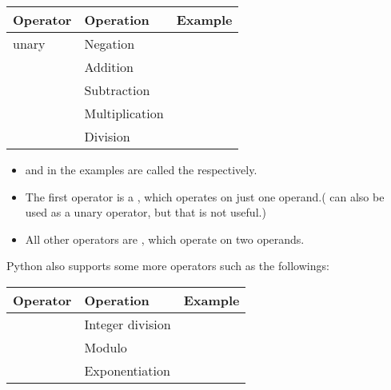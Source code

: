 \documentclass[letterpaper,10pt,english]{sphinxmanual}
\begin{document}
\begin{savenotes}\sphinxattablestart
\centering
\begin{tabulary}{\linewidth}[t]{|T|T|T|}
\hline
\sphinxstyletheadfamily 
Operator
&\sphinxstyletheadfamily 
Operation
&\sphinxstyletheadfamily 
Example
\\
\hline
unary \sphinxcode{\sphinxupquote{\sphinxhyphen{}}}
&
Negation
&
\\
\hline
\sphinxcode{\sphinxupquote{+}}
&
Addition
&
\\
\hline
\sphinxcode{\sphinxupquote{\sphinxhyphen{}}}
&
Subtraction
&
\\
\hline
\sphinxcode{\sphinxupquote{*}}
&
Multiplication
&
\\
\hline
\sphinxcode{\sphinxupquote{/}}
&
Division
&
\\
\hline
\end{tabulary}
\par
\sphinxattableend\end{savenotes}
\begin{itemize}
\item {} 
 and  in the examples are called the  respectively.

\item {} 
The first operator is a , which operates on just one operand.(\sphinxcode{\sphinxupquote{+}} can also be used as a unary operator, but that is not useful.)

\item {} 
All other operators are , which operate on two operands.

\end{itemize}

Python also supports some more operators such as the followings:


\begin{savenotes}\sphinxattablestart
\centering
\begin{tabulary}{\linewidth}[t]{|T|T|T|}
\hline
\sphinxstyletheadfamily 
Operator
&\sphinxstyletheadfamily 
Operation
&\sphinxstyletheadfamily 
Example
\\
\hline
\sphinxcode{\sphinxupquote{//}}
&
Integer division
&
\\
\hline
\sphinxcode{\sphinxupquote{\%}}
&
Modulo
&
\\
\hline
\sphinxcode{\sphinxupquote{**}}
&
Exponentiation
&
\\
\hline
\end{tabulary}
\par
\sphinxattableend\end{savenotes}
\end{document}
